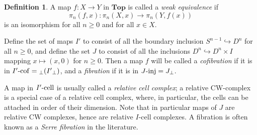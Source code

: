 \documentclass{amsart}
\theoremstyle{plain}
\theoremstyle{definition}
\newtheorem{definition}[theorem]{Definition}
\newcommand{\Top}{\mbf{Top}}
\newcommand{\sseq}{\subseteq}
\newcommand{\0}{\mathbf{0}}
\newcommand{\into}{\hookrightarrow}
\newcommand{\mbf}[1]{\mathbf{#1}}
\renewcommand{\(}{\left(}
\renewcommand{\)}{\right)}
\newcommand{\inj}{\text-\mathrm{inj}}
\newcommand{\cell}{\text-\mathrm{cell}}
\newcommand{\cof}{\text-\mathrm{cof}}
\begin{document}
\begin{definition}
  A map $f:X\to Y$ in $\Top$ is called a \textit{weak equivalence} if
  \[\pi_n(f,x):\pi_n(X,x)\to\pi_n(Y,f(x))\]
  is an isomorphism for all $n\geq0$ and for all $x\in X$.

  Define the set of maps $I'$ to consist of all the boundary inclusion $S^{n-1}\into D^n$ for all $n\geq0$, and define the set $J$ to consist of all the inclusions $D^n\into D^n\times I$ mapping $x\mapsto(x,0)$ for $n\geq0$. Then a map $f$ will be called a \textit{cofibration} if it is in $I'\cof={_\perp({I'}_\perp)}$, and a \textit{fibration} if it is in $J\inj=J_\perp$.

  A map in $I'\cell$ is usually called a \textit{relative cell complex}; a relative CW-complex is a special case of a relative cell complex, where, in particular, the cells can be attached in order of their dimension. Note that in particular maps of $J$ are relative CW complexes, hence are relative $I$-cell complexes. 
  A fibration is often known as a \textit{Serre fibration} in the literature.
\end{definition}
\end{document}
